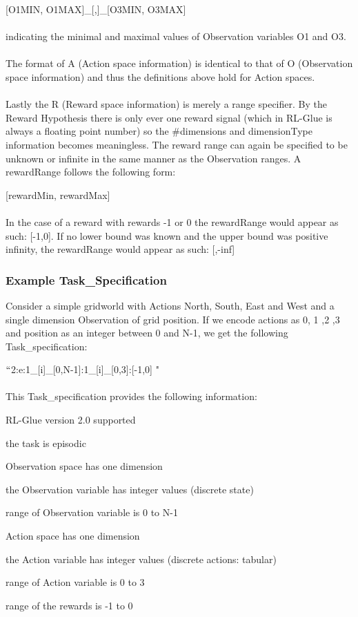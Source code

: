 \documentclass[11pt]{article}
\begin{document}
\hspace{30 pt} [O1MIN, O1MAX]\_[,]\_[O3MIN, O3MAX]
\\\\
indicating the minimal and maximal values of Observation variables O1 and O3.
\\\\
The format of A (Action space information) is identical to that of O (Observation space information) and thus the definitions above hold for Action spaces.
\\\\
Lastly the R (Reward space information) is merely a range specifier. By the Reward Hypothesis there is only ever one reward signal (which in RL-Glue is always a floating point number) so the \#dimensions and dimensionType information becomes meaningless. The reward range can again be specified to be unknown or infinite in the same manner as the Observation ranges.  A rewardRange follows the following form:

\hspace{30 pt} [rewardMin, rewardMax]
\\\\
In the case of a reward with rewards -1 or 0 the rewardRange would appear as such: [-1,0].
If no lower bound was known and the upper bound was positive infinity, the rewardRange would appear as such: [,-inf]
\subsubsection{Example Task\_Specification}
Consider a simple gridworld with Actions North, South, East and West and a single dimension Observation of grid position. If we encode actions as 0, 1 ,2 ,3 and position as an integer between 0 and N-1, we get the following Task\_specification:

\hspace{30 pt} $``$2:e:1\_[i]\_[0,N-1]:1\_[i]\_[0,3]:[-1,0] "
\\\\
This Task\_specification provides the following information:
\begin{description}
\setlength{\itemsep}{-1mm}
\item[-] RL-Glue version 2.0 supported
\item[-] the task is episodic
\item[-] Observation space has one dimension
\item[-] the Observation variable has integer values (discrete state)
\item[-] range of Observation variable is 0 to N-1
\item[-] Action space has one dimension
\item[-] the Action variable has integer values (discrete actions: tabular)
\item[-] range of Action variable is 0 to 3
\item[-] range of the rewards is -1 to 0
\end{description}
\end{document}
